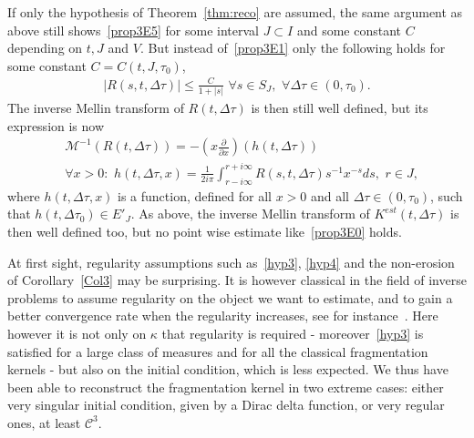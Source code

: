 \documentclass[AHL,Unicode,longabstracts,published]{cedram}
\newcommand*\M{\mathcal{M}}
\newcommand{\clC}{\mathcal{C}}
\let\oldforall\forall
\renewcommand*{\forall}{\mathrel{\oldforall}}
\begin{document}
\begin{rema}
If only the hypothesis of Theorem~\ref{thm:reco} are assumed, the same argument as above still shows~\eqref{prop3E5} for some interval $J\subset I$ and some constant $C$ depending on $t, J$ and $V$. But instead of~\eqref{prop3E1} only the following holds for some constant $C=C(t, J, \tau _0)$,
\begin{align}\label{prop3E7}
\left|R(s, t, \Delta \tau)\right|\le \frac{C}{1+|s|}\,\,\forall s\in S_J,\,\,\forall \Delta \tau \in (0, \tau _0).
\end{align}
The inverse Mellin transform of $R(t, \Delta \tau)$ is then still well defined, but its expression is now
\begin{align*}
&\M^{-1}(R(t, \Delta \tau))=-\left(x \frac{\partial}{\partial x}\right)(h(t, \Delta \tau))\\
&\forall x>0:\,\,h(t, \Delta \tau, x)= \frac {1} {2i\pi }\int _{ r-i\infty }^{r+i\infty} R(s, t, \Delta \tau)s^{-1}x^{-s}ds,\,\,r\in J,
\end{align*}
where $h(t, \Delta \tau, x)$ is a function, defined for all $x>0$ and all $\Delta \tau\in (0, \tau _0)$, such that $h(t, \Delta \tau _0)\in E'_J$. As above, the inverse Mellin transform of $K^{est}(t, \Delta \tau)$ is then well defined too, but no point wise estimate like~\eqref{prop3E0} holds.
\end{rema}


\begin{rema}
At first sight, regularity assumptions such as~\eqref{hyp3}, \eqref{hyp4} and the non-erosion of Corollary~\ref{Col3} may be surprising. It is however classical in the field of inverse problems to assume regularity on the object we want to estimate, and to gain a better convergence rate when the regularity increases, see for instance~\cite{Engl}. Here however it is not only on $\kappa$ that regularity is required - moreover~\eqref{hyp3} is satisfied for a large class of measures and for all the classical fragmentation kernels - but also on the initial condition, which is less expected. We thus have been able to reconstruct the fragmentation kernel in two extreme cases: either very singular initial condition, given by a Dirac delta function, or very regular ones, at least $\clC ^3$.
\end{rema}
\end{document}
